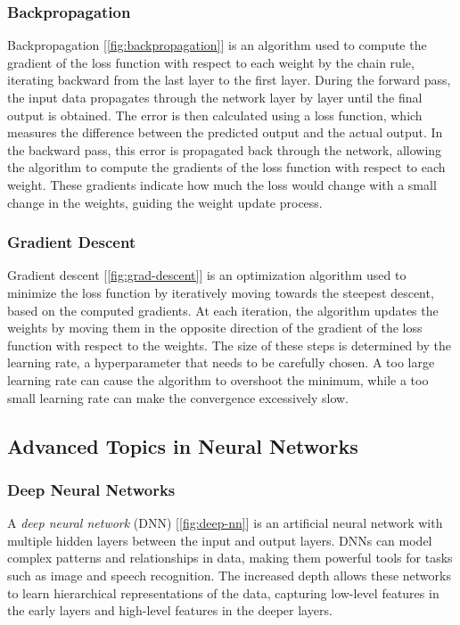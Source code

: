 \documentclass[../Thesis.tex]{subfiles}
\begin{document}
\subsubsection{Backpropagation}
Backpropagation [\autoref{fig:backpropagation}] is an algorithm used to compute the gradient of the loss function with respect to each weight by the chain rule, iterating backward from the last layer to the first layer. During the forward pass, the input data propagates through the network layer by layer until the final output is obtained. The error is then calculated using a loss function, which measures the difference between the predicted output and the actual output. In the backward pass, this error is propagated back through the network, allowing the algorithm to compute the gradients of the loss function with respect to each weight. These gradients indicate how much the loss would change with a small change in the weights, guiding the weight update process.


\subsubsection{Gradient Descent}
Gradient descent [\autoref{fig:grad-descent}] is an optimization algorithm used to minimize the loss function by iteratively moving towards the steepest descent, based on the computed gradients. At each iteration, the algorithm updates the weights by moving them in the opposite direction of the gradient of the loss function with respect to the weights. The size of these steps is determined by the learning rate, a hyperparameter that needs to be carefully chosen. A too large learning rate can cause the algorithm to overshoot the minimum, while a too small learning rate can make the convergence excessively slow.

\subsection{Advanced Topics in Neural Networks}

\subsubsection{Deep Neural Networks}
A \emph{deep neural network} (DNN) [\autoref{fig:deep-nn}] is an artificial neural network with multiple hidden layers between the input and output layers. DNNs can model complex patterns and relationships in data, making them powerful tools for tasks such as image and speech recognition. The increased depth allows these networks to learn hierarchical representations of the data, capturing low-level features in the early layers and high-level features in the deeper layers. 

\end{document}
